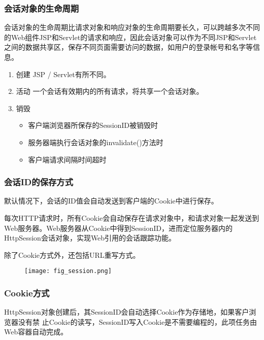 \begin{frame}[fragile] %
\frametitle{会话对象的生命周期} 

会话对象的生命周期比请求对象和响应对象的生命周期要长久，可以跨越多次不同的Web组件JSP和Servlet的请求和响应，因此会话对象可以作为不同JSP和Servlet之间的数据共享区，保存不同页面需要访问的数据，如用户的登录帐号和名字等信息。

\begin{enumerate}
\item {\hei 创建} JSP / Servlet有所不同。
\item {\hei 活动} 一个会话有效期内的所有请求，将共享一个会话对象。
\item {\hei 销毁} 
  \begin{itemize}
  \item 客户端浏览器所保存的SessionID被销毁时
  \item 服务器端执行会话对象的invalidate()方法时
  \item 客户端请求间隔时间超时
  \end{itemize}
\end{enumerate}
\end{frame}

\begin{frame}[fragile] %
\frametitle{会话ID的保存方式} 

默认情况下，会话的ID值会{\Red\hei 自动发送到客户端的Cookie中进行保存}。

{\kai 每次HTTP请求时，所有Cookie会自动保存在请求对象中，和请求对象一起发送到Web服务器。Web服务器从Cookie中得到SessionID，进而定位服务器内的HttpSession会话对象，实现Web引用的会话跟踪功能。}

除了Cookie方式外，还包括URL重写方式。

\begin{figure}
\centering
\texttt{[image: fig\_session.png]}
\end{figure}
\end{frame}

\begin{frame}[fragile] %
\frametitle{Cookie方式} 

HttpSession对象创建后，其{\hei SessionID会自动选择Cookie作为存储地}，如果客户浏览器没有禁
止Cookie的读写，SessionID写入Cookie是不需要编程的，此项任务由Web容器自动完成。
\end{frame}

